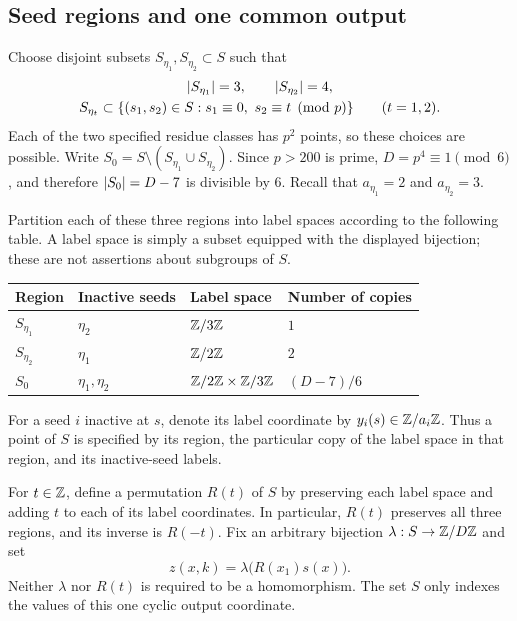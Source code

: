 \subsection{Seed regions and one common output}

Choose disjoint subsets $S_{\eta_1},S_{\eta_2}\subset S$ such that
\begin{equation}\label{model:seed-regions}
 \begin{gathered}
 \lvert S_{\eta_1}\rvert=3,\qquad \lvert S_{\eta_2}\rvert=4,\\
 S_{\eta_t}\subset
 \{(s_1,s_2)\in S:s_1\equiv0,\ s_2\equiv t\pmod p\}
 \qquad(t=1,2).
 \end{gathered}
\end{equation}
Each of the two specified residue classes has $p^2$ points, so these
choices are possible.  Write
$S_0=S\setminus(S_{\eta_1}\cup S_{\eta_2})$.  Since $p>200$ is prime,
$D=p^4\equiv1\pmod6$, and therefore $\lvert S_0\rvert=D-7$ is divisible by
$6$.  Recall that $a_{\eta_1}=2$ and $a_{\eta_2}=3$.

Partition each of these three regions into label spaces according to
the following table.  A label space is simply a subset equipped with
the displayed bijection; these are not assertions about subgroups of
$S$.
\begin{center}
\begin{tabular}{llll}
\toprule
Region & Inactive seeds & Label space & Number of copies\\
\midrule
$S_{\eta_1}$ & $\eta_2$ & $\mathbb Z/3\mathbb Z$ & $1$\\
$S_{\eta_2}$ & $\eta_1$ & $\mathbb Z/2\mathbb Z$ & $2$\\
$S_0$ & $\eta_1,\eta_2$ & $\mathbb Z/2\mathbb Z\times\mathbb Z/3\mathbb Z$ & $(D-7)/6$\\
\bottomrule
\end{tabular}
\end{center}
For a seed $i$ inactive at $s$, denote its label coordinate by
$y_i(s)\in\mathbb Z/a_i\mathbb Z$.  Thus a point of $S$ is specified by its region,
the particular copy of the label space in that region, and its
inactive-seed labels.

For $t\in\mathbb Z$, define a permutation $R(t)$ of $S$ by preserving each
label space and adding $t$ to each of its label coordinates.  In
particular, $R(t)$ preserves all three regions, and its inverse is
$R(-t)$.  Fix an arbitrary bijection $\lambda:S\to\mathbb Z/D\mathbb Z$ and set
\begin{equation}\label{model:shared-output}
 z(x,k)=\lambda\bigl(R(x_1)s(x)\bigr).
\end{equation}
Neither $\lambda$ nor $R(t)$ is required to be a homomorphism.  The
set $S$ only indexes the values of this one cyclic output coordinate.


